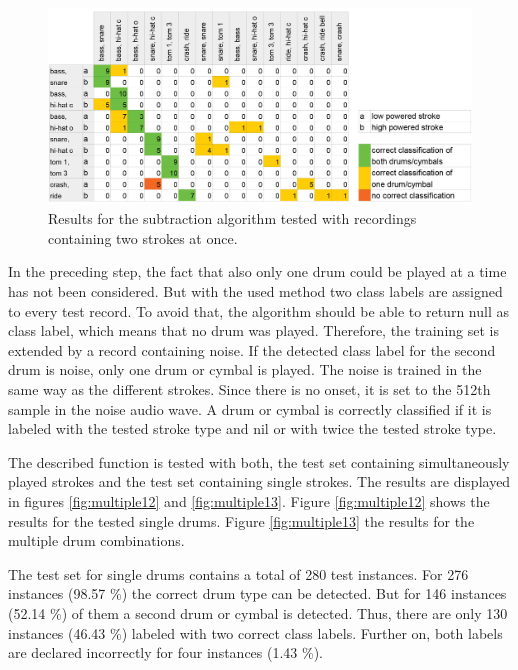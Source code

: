 \begin{figure}[htbp]
	\centering
	\includegraphics[width=.8\textwidth]{images/classification_matrix/multiple1_test_1.png}
	\caption{Results for the subtraction algorithm tested with recordings containing two strokes at once.}
	\label{fig:multiple11}
\end{figure}

In the preceding step, the fact that also only one drum could be played at a time has not been considered. But with the used method two class labels are assigned to every test record. To avoid that, the algorithm should be able to return null as class label, which means that no drum was played. Therefore, the training set is extended by a record containing noise. If the detected class label for the second drum is noise, only one drum or cymbal is played. The noise is trained in the same way as the different strokes. Since there is no onset, it is set to the 512th sample in the noise audio wave. A drum or cymbal is correctly classified if it is labeled with the tested stroke type and nil or with twice the tested stroke type.

The described function is tested with both, the test set containing simultaneously played strokes and the test set containing single strokes. The results are displayed in figures \ref{fig:multiple12} and \ref{fig:multiple13}. Figure \ref{fig:multiple12} shows the results for the tested single drums. Figure \ref{fig:multiple13} the results for the multiple drum combinations.  

The test set for single drums contains a total of 280 test instances. For 276 instances (98.57 \%) the correct drum type can be detected. But for 146 instances (52.14 \%) of them a second drum or cymbal is detected. Thus, there are only 130 instances (46.43 \%) labeled with two correct class labels. Further on, both  labels  are declared incorrectly for four instances (1.43 \%). 

